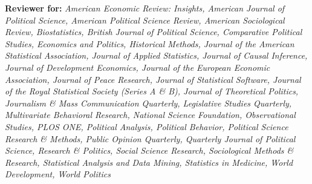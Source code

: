 \documentclass[margin,line,12pt]{res}
\begin{document}
\begin{resume}
\textbf{Reviewer for:} \emph{American Economic Review: Insights, American Journal of Political Science, American Political Science Review, American Sociological Review, Biostatistics, British Journal of Political Science, Comparative Political Studies, Economics and Politics, Historical Methods, Journal of the American Statistical Association, Journal of Applied Statistics, Journal of Causal Inference, Journal of Development Economics, Journal of the European Economic Association, Journal of Peace Research, Journal of Statistical Software, Journal of the Royal Statistical Society (Series A \& B), Journal of Theoretical Politics, Journalism \& Mass Communication Quarterly, Legislative Studies Quarterly, Multivariate Behavioral Research, National Science Foundation, Observational Studies, PLOS ONE, Political Analysis, Political Behavior, Political Science Research \& Methods, Public Opinion Quarterly, Quarterly Journal of Political Science, Research \& Politics, Social Science Research, Sociological Methods \& Research,  Statistical Analysis and Data Mining, Statistics in Medicine, World Development, World Politics}




\end{resume}
\end{document}
